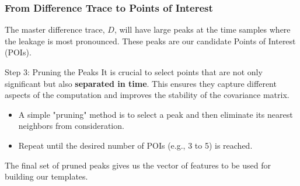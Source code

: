 \begin{frame}
    \frametitle{From Difference Trace to Points of Interest}
    
    The master difference trace, $D$, will have large peaks at the time samples where the leakage is most pronounced. These peaks are our candidate Points of Interest (POIs).
    
    
    \begin{alertblock}{Step 3: Pruning the Peaks}
        It is crucial to select points that are not only significant but also \textbf{separated in time}. This ensures they capture different aspects of the computation and improves the stability of the covariance matrix.
        
        \begin{itemize}
            \item A simple "pruning" method is to select a peak and then eliminate its nearest neighbors from consideration.
            \item Repeat until the desired number of POIs (e.g., 3 to 5) is reached.
        \end{itemize}
    \end{alertblock}
    
    The final set of pruned peaks gives us the vector of features to be used for building our templates.
    
\end{frame}
